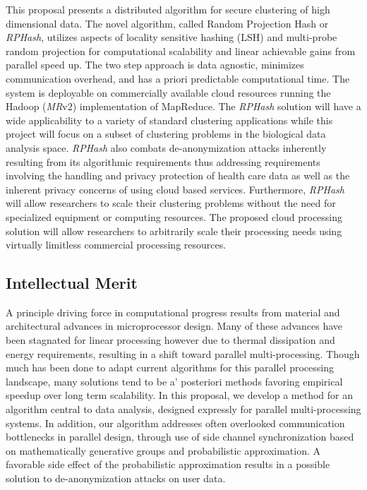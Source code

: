 \documentclass[11pt]{article}
\begin{document}
This proposal presents a distributed algorithm for secure clustering of high dimensional
data.  The novel algorithm, called Random Projection Hash or \emph{RPHash}, utilizes
aspects of locality sensitive hashing (LSH) and multi-probe random projection for
computational scalability and linear achievable gains from parallel speed up.  The two
step approach is data agnostic, minimizes communication overhead, and has a priori
predictable computational time.  The system is deployable on commercially available cloud
resources running the Hadoop (\emph{MR}v2) implementation of MapReduce.  The \emph{RPHash}
solution will have a wide applicability to a variety of standard clustering applications
while this project will focus on a subset of clustering problems in the biological data
analysis space.  \emph{RPHash} also combats de-anonymization attacks inherently resulting
from its algorithmic requirements thus addressing requirements involving the handling and
privacy protection of health care data\cite{presidential} as well as the inherent privacy 
concerns of using
cloud based services.  Furthermore, \emph{RPHash} will allow researchers to scale their
clustering problems without the need for specialized equipment or computing resources.
The proposed cloud processing solution will allow researchers to arbitrarily scale their
processing needs using virtually limitless commercial processing resources.

\subsection*{Intellectual Merit}
A principle driving force in computational progress results from material and architectural
advances in microprocessor design. Many of these advances have been stagnated for linear processing 
however due to thermal dissipation and energy requirements, resulting in a shift toward parallel multi-processing.
Though much has been done to adapt current algorithms for this parallel processing landscape, many
solutions tend to be a' posteriori methods favoring empirical speedup over long term scalability. In this
proposal, we develop a method for an algorithm central to data analysis, designed expressly for 
parallel multi-processing systems. In addition, our algorithm addresses often overlooked communication
bottlenecks in parallel design, through use of side channel synchronization based on mathematically 
generative groups and probabilistic approximation. A favorable side effect of the probabilistic
approximation results in a possible solution to de-anonymization attacks\cite{deanon1}\cite{deanon2} on user data.
\end{document}
